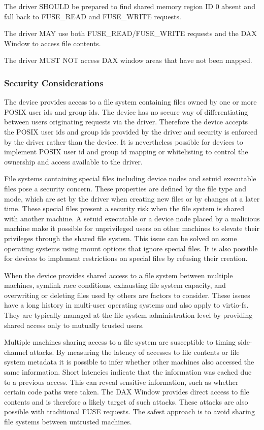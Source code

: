 The driver SHOULD be prepared to find shared memory region ID 0 absent and fall back to FUSE\_READ and FUSE\_WRITE requests.

The driver MAY use both FUSE\_READ/FUSE\_WRITE requests and the DAX Window to access file contents.

The driver MUST NOT access DAX window areas that have not been mapped.

\subsubsection{Security Considerations}\label{sec:Device Types / File System Device / Security Considerations}

The device provides access to a file system containing files owned by one or
more POSIX user ids and group ids.  The device has no secure way of
differentiating between users originating requests via the driver.  Therefore
the device accepts the POSIX user ids and group ids provided by the driver and
security is enforced by the driver rather than the device.  It is nevertheless
possible for devices to implement POSIX user id and group id mapping or
whitelisting to control the ownership and access available to the driver.

File systems containing special files including device nodes and setuid
executable files pose a security concern.  These properties are defined by the
file type and mode, which are set by the driver when creating new files or by
changes at a later time.  These special files present a security risk when the
file system is shared with another machine.  A setuid executable or a device
node placed by a malicious machine make it possible for unprivileged users on
other machines to elevate their privileges through the shared file system.
This issue can be solved on some operating systems using mount options that
ignore special files.  It is also possible for devices to implement
restrictions on special files by refusing their creation.

When the device provides shared access to a file system between multiple
machines, symlink race conditions, exhausting file system capacity, and
overwriting or deleting files used by others are factors to consider.  These
issues have a long history in multi-user operating systems and also apply to
virtio-fs.  They are typically managed at the file system administration level
by providing shared access only to mutually trusted users.

Multiple machines sharing access to a file system are susceptible to timing
side-channel attacks.  By measuring the latency of accesses to file contents or
file system metadata it is possible to infer whether other machines also
accessed the same information.  Short latencies indicate that the information
was cached due to a previous access.  This can reveal sensitive information,
such as whether certain code paths were taken.  The DAX Window provides direct
access to file contents and is therefore a likely target of such attacks.
These attacks are also possible with traditional FUSE requests.  The safest
approach is to avoid sharing file systems between untrusted machines.

